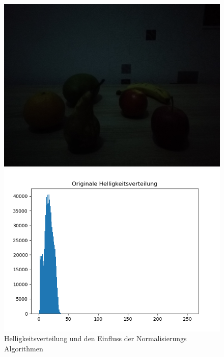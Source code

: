 \documentclass[a4paper,12pt,oneside]{article}
\begin{document}
\begin{figure}[htb]
\caption{Helligkeitsverteilung und den Einfluss der Normalisierungs Algorithmen}
\label{img:hellver}
\begin{minipage}[c]{0.4\textwidth}
\includegraphics[width=\textwidth]{Sources/Anhang/resize_0250.jpg}
\end{minipage}
\hfill
\begin{minipage}[c]{0.4\textwidth}
\includegraphics[width=\textwidth]{Sources/Anhang/resize_0250.png}
\end{minipage}
\end{figure}
\end{document}
